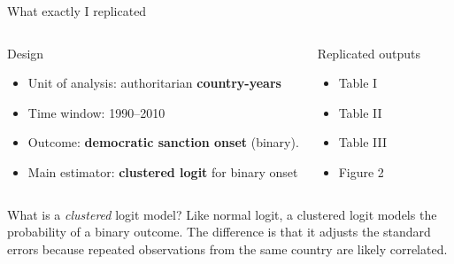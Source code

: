 \documentclass[
11pt,notheorems,hyperref={pdfauthor=Jakob}
]{beamer}
\begin{document}
	\begin{frame}{What exactly I replicated}
		\begin{columns}[T,onlytextwidth]
			\begin{block}{Design}
				\begin{itemize}
					\item Unit of analysis: authoritarian \textbf{country-years}
					\item Time window: 1990--2010
					\item Outcome: \textbf{democratic sanction onset} (binary).
					\item Main estimator: \textbf{clustered logit} for binary onset
				\end{itemize}
			\end{block}
			
			\begin{block}{Replicated outputs}
				\begin{itemize}
					\item Table I
					\item Table II
					\item Table III
					\item Figure 2
				\end{itemize}
			\end{block}
		\end{columns}
		
		\vspace{0.4em}
		
		\begin{exampleblock}{What is a \textit{clustered} logit model?}
			Like normal logit, a clustered logit models the probability of a binary outcome. The difference is that it adjusts the standard errors because repeated observations from the same country are likely correlated.
		\end{exampleblock}

	\end{frame}
	
\end{document}

